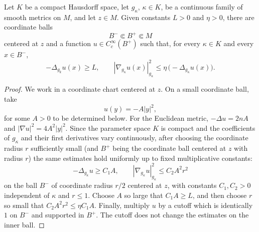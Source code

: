 \documentclass[10pt,a4paper]{amsart}
\let\geq\geqslant
\let\leq\leqslant
\let\leq\leqslant
\begin{document}
\begin{lemma}\label{lem:local-bump}
Let $K$ be a compact Hausdorff space, let $g_\kappa$,  $\kappa\in K$, be a continuous family of smooth metrics
on $M$, and let $z\in M$. Given constants $L>0$ and $\eta>0$, there are coordinate balls
\[
 B^-\Subset B^+\Subset M
\]
centered at $z$ and a function $u\in C_c^\infty(B^+)$ such that, for every $\kappa\in K$ and every
$x\in B^-$,
\begin{equation}\label{eq:bump-estimates}
 -\Delta_{g_k}u(x)\geq L,
 \qquad
 |\nabla_{g_\kappa}u(x)|_{g_\kappa}^2\leq \eta\,\bigl(-\Delta_{g_\kappa}u(x)\bigr).
\end{equation}
\end{lemma}

\begin{proof}
We work in a coordinate chart centered at $z$. On a small coordinate ball, take
\[
 u(y)=-A|y|^2,
\]
for some $A>0$ to be determined below.
For the Euclidean metric, $-\Delta u=2nA$ and $|\nabla u|^2=4A^2|y|^2$.
Since the parameter space $K$ is compact and the coefficients of $g_\kappa$ and their first derivatives vary continuously, after choosing the
coordinate radius $r$ sufficiently small (and $B^+$ being the coordinate ball centered at $z$ with radius $r$) the same estimates hold uniformly up to fixed multiplicative
constants:
\[
 -\Delta_{g_\kappa}u\geq C_1A,
 \qquad
 |\nabla_{g_\kappa}u|_{g_\kappa}^2\leq C_2A^2r^2
\]
on the ball $B^-$ of coordinate radius $r/2$ centered at $z$, with constants $C_1,C_2>0$ independent of $\kappa$ and $r\leq 1$.
Choose $A$ so large that $C_1A\geq L$, and then choose $r$ so small that $C_2A^2r^2\leq \eta C_1A$. Finally, multiply $u$ by a cutoff which is identically $1$ on $B^-$ and supported in $B^+$. 
The cutoff does not change the estimates on the inner ball.
\end{proof}
\end{document}
